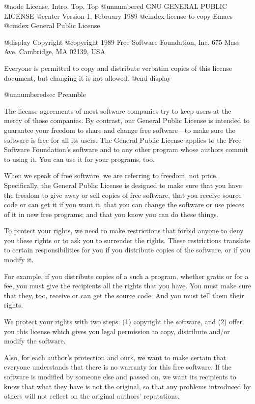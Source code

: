 @node License, Intro, Top, Top
@unnumbered GNU GENERAL PUBLIC LICENSE
@center Version 1, February 1989
@cindex license to copy Emacs
@cindex General Public License

@display
Copyright @copyright{} 1989 Free Software Foundation, Inc.
675 Mass Ave, Cambridge, MA 02139, USA

Everyone is permitted to copy and distribute verbatim copies
of this license document, but changing it is not allowed.
@end display

@unnumberedsec Preamble

  The license agreements of most software companies try to keep users
at the mercy of those companies.  By contrast, our General Public
License is intended to guarantee your freedom to share and change free
software---to make sure the software is free for all its users.  The
General Public License applies to the Free Software Foundation's
software and to any other program whose authors commit to using it.
You can use it for your programs, too.

  When we speak of free software, we are referring to freedom, not
price.  Specifically, the General Public License is designed to make
sure that you have the freedom to give away or sell copies of free
software, that you receive source code or can get it if you want it,
that you can change the software or use pieces of it in new free
programs; and that you know you can do these things.

  To protect your rights, we need to make restrictions that forbid
anyone to deny you these rights or to ask you to surrender the rights.
These restrictions translate to certain responsibilities for you if you
distribute copies of the software, or if you modify it.

  For example, if you distribute copies of a such a program, whether
gratis or for a fee, you must give the recipients all the rights that
you have.  You must make sure that they, too, receive or can get the
source code.  And you must tell them their rights.

  We protect your rights with two steps: (1) copyright the software, and
(2) offer you this license which gives you legal permission to copy,
distribute and/or modify the software.

  Also, for each author's protection and ours, we want to make certain
that everyone understands that there is no warranty for this free
software.  If the software is modified by someone else and passed on, we
want its recipients to know that what they have is not the original, so
that any problems introduced by others will not reflect on the original
authors' reputations.

